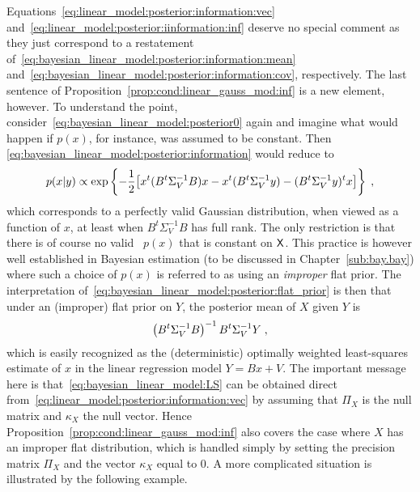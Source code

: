Equations~\eqref{eq:linear_model:posterior:information:vec}
and~\eqref{eq:linear_model:posterior:iinformation:inf} deserve no special
comment as they just correspond to a restatement
of~\eqref{eq:bayesian_linear_model:posterior:information:mean}
and~\eqref{eq:bayesian_linear_model:posterior:information:cov}, respectively.
The last sentence of Proposition~\ref{prop:cond:linear_gauss_mod:inf} is a new
element, however. To understand the point,
consider~\eqref{eq:bayesian_linear_model:posterior0} again and imagine what
would happen if $p(x)$, for instance, was assumed to be constant. Then
\eqref{eq:bayesian_linear_model:posterior:information} would reduce to
\begin{equation}
  \label{eq:bayesian_linear_model:posterior:flat_prior}
  p(x|y) \propto \exp \left\{ -\frac{1}{2}\bigl[x^t(B^t\Sigma_V^{-1}B)x - x^t(B^t\Sigma_V^{-1}y) - (B^t\Sigma_V^{-1}y)^t x\bigr] \right\} \; ,
\end{equation}
which corresponds to a perfectly valid Gaussian distribution, when viewed as a
function of $x$, at least when $B^t\Sigma_V^{-1}B$ has full rank. The
only restriction is that there is of course no valid \pdf\ $p(x)$ that is
constant on $\mathsf{X}$. This practice is however
well established in Bayesian estimation (to be discussed in
Chapter~\ref{sub:bay.bay}) where such a choice of $p(x)$ is referred to as
using an {\em improper} flat prior.
The interpretation of~\eqref{eq:bayesian_linear_model:posterior:flat_prior} is
then that under an (improper) flat prior on $Y$, the posterior mean of $X$
given $Y$ is
\begin{equation}
  \label{eq:bayesian_linear_model:LS}
  \left(B^t\Sigma_V^{-1}B\right)^{-1}B^t\Sigma_V^{-1}Y \; ,
\end{equation}
which is easily recognized as the (deterministic) optimally weighted
least-squares estimate of $x$ in the linear regression model $Y = B x + V$. The
important message here is that~\eqref{eq:bayesian_linear_model:LS} can be
obtained direct from~\eqref{eq:linear_model:posterior:information:vec} by
assuming that $\Pi_X$ is the null matrix and $\kappa_X$ the null vector. Hence
Proposition~\ref{prop:cond:linear_gauss_mod:inf} also covers the case where $X$
has an improper flat distribution, which is handled simply by setting the
precision matrix $\Pi_X$ and the vector $\kappa_X$ equal to 0. A
more complicated situation is illustrated by the following example.

